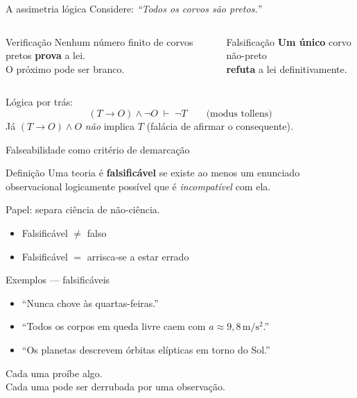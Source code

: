 \documentclass[aspectratio=169]{beamer}
\newcommand{\impt}[1]{\textcolor{maccent}{\textbf{#1}}}
\newcommand{\ntc}[1]{\textcolor{mprimary}{#1}}
\begin{document}
\begin{frame}{A assimetria lógica}
Considere: \emph{``Todos os corvos são pretos.''}
\vspace{0.4cm}
\pause
\begin{columns}[t]
\begin{block}{Verificação}
Nenhum número finito de corvos pretos \impt{prova} a lei. \\[0.2cm]
O próximo pode ser branco.
\end{block}

\pause
\begin{block}{Falsificação}
\impt{Um único} corvo não-preto \\
\impt{refuta} a lei definitivamente.
\end{block}
\end{columns}
\vspace{0.5cm}
\pause
\ntc{Lógica por trás:}
\[
(T \rightarrow O) \wedge \neg O \;\vdash\; \neg T \qquad \text{(modus tollens)}
\]
Já $(T \rightarrow O) \wedge O$ \emph{não} implica $T$ (falácia de afirmar o consequente).
\end{frame}

\begin{frame}{Falseabilidade como critério de demarcação}
\begin{block}{Definição}
Uma teoria é \impt{falsificável} se existe ao menos um enunciado observacional logicamente possível que é \emph{incompatível} com ela.
\end{block}
\pause
\vspace{0.4cm}
\ntc{Papel:} separa ciência de não-ciência.
\pause
\vspace{0.3cm}
\begin{itemize}
  \item Falsificável $\neq$ falso
  \item Falsificável $=$ arrisca-se a estar errado
\end{itemize}
\end{frame}

\begin{frame}{Exemplos --- falsificáveis}
\begin{itemize}
  \item ``Nunca chove às quartas-feiras.''
  \pause
  \item ``Todos os corpos em queda livre caem com $a \approx 9{,}8\,\mathrm{m/s^2}$.''
  \pause
  \item ``Os planetas descrevem órbitas elípticas em torno do Sol.''
\end{itemize}
\vspace{0.5cm}
\pause
\ntc{Cada uma proíbe algo.} \\
Cada uma pode ser derrubada por uma observação.
\end{frame}
\end{document}

